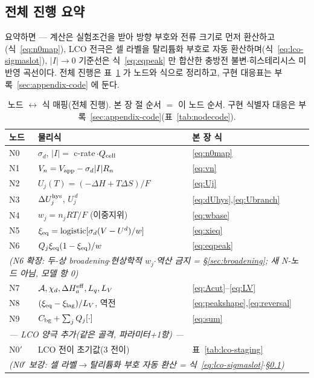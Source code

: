 \subsection{전체 진행 요약}\label{sec:facade}
요약하면 --- 계산은 실험조건을 받아 방향 부호와 전류 크기로 먼저 환산하고(식~\eqref{eq:n0map}),
LCO 전극은 셀 라벨을 탈리튬화 부호로 자동 환산하며(식~\eqref{eq:lco-sigmaslot}), $|I|\to0$ 기준선은
식~\eqref{eq:eqpeak} 만 합산한 충방전 불변$\cdot$히스테리시스 미반영 곡선이다. 전체 진행은
표~\ref{tab:nodemap} 가 노드와 식으로 정리하고, 구현 대응표는
부록~\ref{sec:appendix-code} 에 둔다.

\begin{table}[t]
\centering
\renewcommand{\arraystretch}{1.3}
\caption{노드 $\leftrightarrow$ 식 매핑(전체 진행). 본 장 절 순서 $=$ 이 노드 순서.
구현 식별자 대응은 부록~\ref{sec:appendix-code}(표~\ref{tab:nodecode}).}
\label{tab:nodemap}
\begin{tabular}{l l l}
\toprule
노드 & 물리식 & 본 장 식 \\
\midrule
N0 & $\sigma_d$, $|I|=$ c-rate$\,\cdot Q_{\mathrm{cell}}$ & \eqref{eq:n0map} \\
N1 & $V_n=V_{\mathrm{app}}-\sigma_d|I|R_n$ & \eqref{eq:vn} \\
N2 & $U_j(T)=(-\Delta H+T\Delta S)/F$ & \eqref{eq:Uj} \\
N3 & $\Delta U_j^{\mathrm{hys}}$, $U_j^{\,d}$ & \eqref{eq:dUhys},\eqref{eq:Ubranch} \\
N4 & $w_j=n_jRT/F$ (이중지위) & \eqref{eq:wbase} \\
N5 & $\xi_{\mathrm{eq}}=\mathrm{logistic}[\sigma_d(V-U^d)/w]$ & \eqref{eq:xieq} \\
N6 & $Q_j\xi_{\mathrm{eq}}(1-\xi_{\mathrm{eq}})/w$ & \eqref{eq:eqpeak} \\
\multicolumn{3}{l}{\emph{\quad(N6 확장: 두-상 broadening$\cdot$현상학적 $w_j$$\cdot$역산 금지 = \S\ref{sec:broadening}; 새 N-노드 아님, 모델 항 0)}}\\
N7 & $\mathcal A,\chi_d,\Delta H_a^{\mathrm{eff}},L_q,L_V$ & \eqref{eq:Acut}--\eqref{eq:LV} \\
N8 & $(\xi_{\mathrm{eq}}-\xi_\mathrm{lag})/L_V$, 역전 & \eqref{eq:peakshape},\eqref{eq:reversal} \\
N9 & $C_{\mathrm{bg}}+\sum_jQ_j[\cdot]$ & \eqref{eq:sum} \\
\midrule
\multicolumn{3}{l}{\emph{— LCO 양극 추가(같은 골격, 파라미터+1항) —}}\\
N0$'$ & LCO 전이 초기값(3 전이) & 표~\ref{tab:lco-staging} \\
\multicolumn{3}{l}{\emph{\quad(N0$'$ 보강: 셀 라벨$\to$탈리튬화 부호 자동 환산 = 식~\eqref{eq:lco-sigmaslot}$\cdot$\S\ref{sec:facade})}}\\

\end{tabular}
\end{table}
